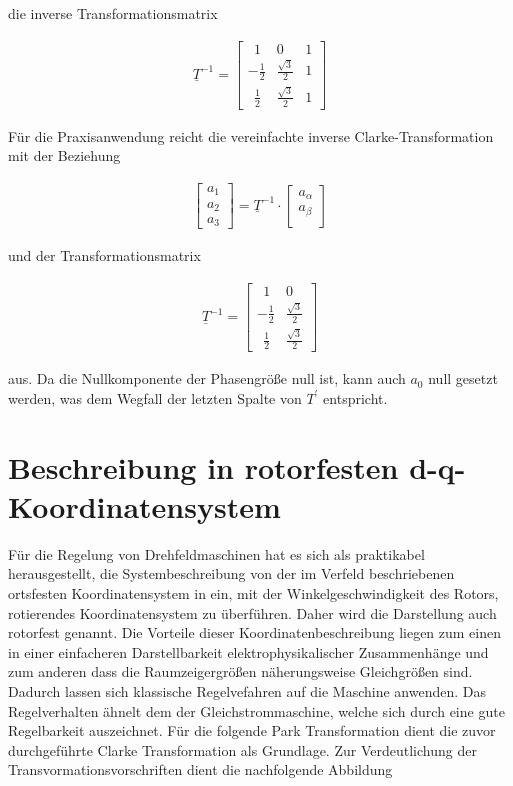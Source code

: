 die inverse Transformationsmatrix

\begin{align}
	\underline{T}^{-1} =
	\begin{bmatrix}
		~~1 & 0 & 1  \\
		-\frac{1}{2} & \frac{\sqrt{3}}{2} & 1 \\
		~~\frac{1}{2} & \frac{\sqrt{3}}{2} & 1
	\end{bmatrix}
	\label{inverseclarkematrixnull}
\end{align}

Für die Praxisanwendung reicht die vereinfachte inverse Clarke-Transformation mit der Beziehung

\begin{align}
	\begin{bmatrix}
		a_{1} \\
		a_{2} \\
		a_{3}
	\end{bmatrix}
	=\underline{T}^{-1}\cdot 
	\begin{bmatrix}
		a_{\alpha} \\
		a_{\beta} \\
	\end{bmatrix}
	\label{inverseclarkevektornulleinfach}
\end{align}
 
 und der Transformationsmatrix 
 
 \begin{align}
 	\underline{T}^{-1} =
 	\begin{bmatrix}
 		~~1 & 0   \\
 		-\frac{1}{2} & \frac{\sqrt{3}}{2}  \\
 		~~\frac{1}{2} & \frac{\sqrt{3}}{2} 
 	\end{bmatrix}
 	\label{inverseclarkematrixnulleinfach}
 \end{align}
 
 aus. Da die Nullkomponente der Phasengröße null ist, kann auch $a_{0}$ null gesetzt werden, was dem Wegfall der letzten Spalte von ${T^\prime}$ entspricht.

\section{Beschreibung in rotorfesten d-q-Koordinatensystem}\label{sec:park}

Für die Regelung von Drehfeldmaschinen hat es sich als praktikabel herausgestellt, die Systembeschreibung von der im Verfeld beschriebenen ortsfesten Koordinatensystem in ein, mit der Winkelgeschwindigkeit des Rotors, rotierendes Koordinatensystem zu überführen. 
Daher wird die Darstellung auch rotorfest genannt. 
Die Vorteile dieser Koordinatenbeschreibung liegen zum einen in einer einfacheren Darstellbarkeit elektrophysikalischer Zusammenhänge und zum anderen dass die Raumzeigergrößen näherungsweise Gleichgrößen sind.
Dadurch lassen sich klassische Regelvefahren auf die Maschine anwenden.
Das Regelverhalten ähnelt dem der Gleichstrommaschine, welche sich durch eine gute Regelbarkeit auszeichnet. 
Für die folgende Park Transformation dient die zuvor durchgeführte Clarke Transformation als Grundlage. 
Zur Verdeutlichung der Transvormationsvorschriften dient die nachfolgende Abbildung


